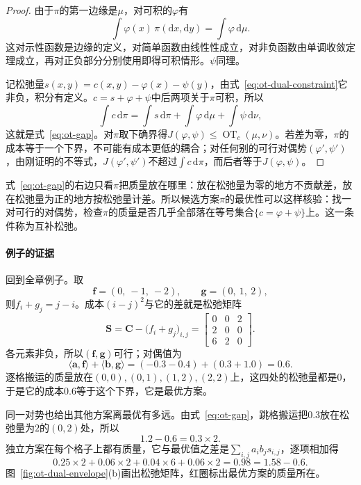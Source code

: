 \begin{proof}
由于$\pi$的第一边缘是$\mu$，对可积的$\varphi$有
\[
 \int\varphi(x)\,\pi(\mathrm{d}x,\mathrm{d}y)=\int\varphi\,\mathrm{d}\mu .
\]
这对示性函数是边缘的定义，对简单函数由线性性成立，对非负函数由单调收敛定理成立，再对正负部分分别使用即得可积情形。$\psi$同理。

记松弛量$s(x,y)=c(x,y)-\varphi(x)-\psi(y)$，由式~\eqref{eq:ot-dual-constraint}它非负，积分有定义。$c=s+\varphi+\psi$中后两项关于$\pi$可积，所以
\[
 \int c\,\mathrm{d}\pi=\int s\,\mathrm{d}\pi+\int\varphi\,\mathrm{d}\mu+\int\psi\,\mathrm{d}\nu ,
\]
这就是式~\eqref{eq:ot-gap}。对$\pi$取下确界得$J(\varphi,\psi)\leq\operatorname{OT}_c(\mu,\nu)$。若差为零，$\pi$的成本等于一个下界，不可能有成本更低的耦合；对任何别的可行对偶势$(\varphi',\psi')$，由刚证明的不等式，$J(\varphi',\psi')$不超过$\int c\,\mathrm{d}\pi$，而后者等于$J(\varphi,\psi)$。
\end{proof}

式~\eqref{eq:ot-gap}的右边只看$\pi$把质量放在哪里：放在松弛量为零的地方不贡献差，放在松弛量为正的地方按松弛量计差。所以候选方案$\pi$的最优性可以这样核验：找一对可行的对偶势，检查$\pi$的质量是否几乎全部落在等号集合$\{c=\varphi+\psi\}$上。这一条件称为互补松弛。

\paragraph{例子的证据}
回到全章例子。取
\[
 \bm{f}=(0,\ -1,\ -2),\qquad \bm{g}=(0,\ 1,\ 2),
\]
则$f_i+g_j=j-i$。成本$(i-j)^{2}$与它的差就是松弛矩阵
\[
 \bm{S}=\bm{C}-\bigl(f_i+g_j\bigr)_{i,j}=\begin{bmatrix}0&0&2\\2&0&0\\6&2&0\end{bmatrix}.
\]
各元素非负，所以$(\bm{f},\bm{g})$可行；对偶值为
\[
 \langle\bm{a},\bm{f}\rangle+\langle\bm{b},\bm{g}\rangle=(-0.3-0.4)+(0.3+1.0)=0.6 .
\]
逐格搬运的质量放在$(0,0),(0,1),(1,2),(2,2)$上，这四处的松弛量都是$0$，于是它的成本$0.6$等于这个下界，它是最优方案。

同一对势也给出其他方案离最优有多远。由式~\eqref{eq:ot-gap}，跳格搬运把$0.3$放在松弛量为$2$的$(0,2)$处，所以
\[
 1.2-0.6=0.3\times2 .
\]
独立方案在每个格子上都有质量，它与最优值之差是$\sum_{i,j}a_ib_js_{i,j}$，逐项相加得
\[
 0.25\times2+0.06\times2+0.04\times6+0.06\times2=0.98=1.58-0.6 .
\]
图~\ref{fig:ot-dual-envelope}(b)画出松弛矩阵，红圈标出最优方案的质量所在。

